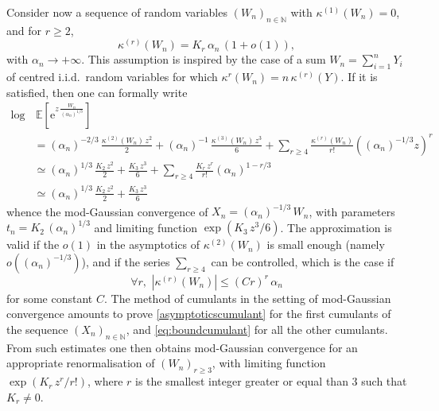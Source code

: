 \documentclass[12pt,a4paper,reqno]{amsart}
\newcommand{\N}{\mathbb{N}}
\newcommand{\E}{\mathrm{e}}
\newcommand{\esper}{\mathbb{E}}
\theoremstyle{remark}
\begin{document}
Consider now a sequence of random variables $(W_n)_{n \in \N}$ with $\kappa^{(1)}(W_n)=0$, and for $r \geq 2$, 
\begin{equation}\kappa^{(r)}(W_n) = K_r \,\alpha_n\,(1+o(1)),\label{asymptoticscumulant}
\end{equation}
with $\alpha_n \to +\infty$. This assumption is inspired by the case of a sum $W_n=\sum_{i=1}^n Y_i$ of centred i.i.d.~random variables for which $\kappa^{r}(W_n)=n\,\kappa^{(r)}(Y)$. If it is satisfied, then  one can formally write
\begin{align*}
\log &\,\esper\!\left[\E^{z\, \frac{W_n}{(\alpha_n)^{1/3}}}\right]\\
&= (\alpha_n)^{-2/3}\,\frac{\kappa^{(2)}(W_n)\,z^2}{2}+(\alpha_n)^{-1}\,\frac{\kappa^{(3)}(W_n)\,z^3}{6}+\sum_{r \geq 4}\frac{\kappa^{(r)}(W_n)}{r!} ((\alpha_n)^{-1/3} z)^r\\
&\simeq (\alpha_n)^{1/3}\,\frac{K_2\,z^2}{2}+\frac{K_3\,z^3}{6}+\sum_{r \geq 4}\frac{K_r\,z^r}{r!} (\alpha_n)^{1-r/3}\\
&\simeq (\alpha_n)^{1/3}\,\frac{K_2\,z^2}{2}+\frac{K_3\,z^3}{6}
\end{align*}
whence the mod-Gaussian convergence of $X_n=(\alpha_n)^{-1/3}\,W_n$, with parameters $t_n=K_2\,(\alpha_n)^{1/3}$ and limiting function $\exp(K_3 \,z^3/6)$. The approximation is valid if the $o(1)$ in the asymptotics of $\kappa^{(2)}(W_n)$ is small enough (namely $o((\alpha_n)^{-1/3})$), and if the series $\sum_{r \geq 4}$ can be controlled, which is the case if
\begin{equation}\forall r,\,\, |\kappa^{(r)}(W_n)|\leq (Cr)^r\,\alpha_n\label{eq:boundcumulant}
\end{equation}
for some constant $C$. The method of cumulants in the setting of mod-Gaussian convergence amounts to prove \eqref{asymptoticscumulant} for the first cumulants of the sequence $(X_n)_{n \in \N}$, and \eqref{eq:boundcumulant} for all the other cumulants. From such estimates one then obtains mod-Gaussian convergence for an appropriate renormalisation of $(W_n)_{r \geq 3}$, with limiting function $\exp(K_r\,z^r/r!)$, where $r$ is the smallest integer greater or equal than $3$ such that $K_r \neq 0$.\bigskip
\end{document}
